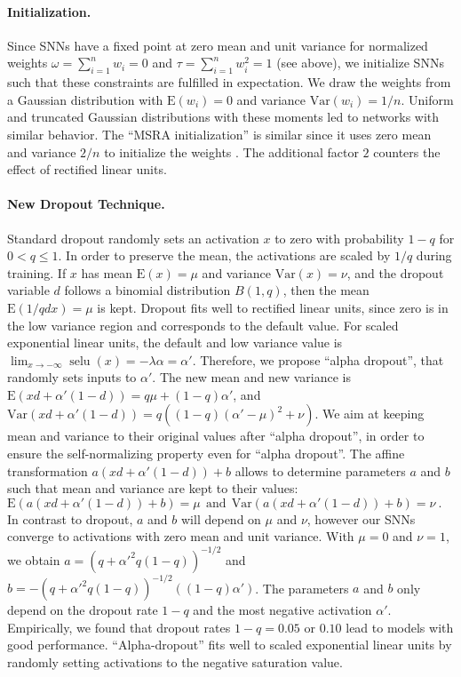 \documentclass{article}
\newcommand\EXP{\mathbf{\mathrm{E}}}
\newcommand\VAR{\mathbf{\mathrm{Var}}}
\renewcommand{\leq}{\leqslant}
\DeclareMathOperator{\selu}{selu}
\begin{document}
\paragraph{Initialization.}
\label{sec:init} 
Since SNNs have a fixed point at zero mean and unit variance 
for normalized weights $\omega=\sum_{i=1}^n w_i=0$ and
$\tau=\sum_{i=1}^n w_i^2=1$ (see above), 
we initialize SNNs such that these
constraints are fulfilled in expectation.
We draw the weights from a Gaussian distribution 
with $\EXP(w_i)=0$ and variance $\VAR(w_i)=1/n$.
Uniform and truncated Gaussian distributions with these moments 
led to networks with similar behavior. 
The ``MSRA initialization''  is similar since 
it uses zero mean and variance $2/n$ to initialize the weights \citep{bib:He2015init}.
The additional factor $2$ counters the effect of rectified 
linear units.

\paragraph{New Dropout Technique.}
\label{sec:dropout} 
Standard dropout randomly sets an activation $x$ to zero with probability $1-q$ for $0 < q \leq 1$. 
In order to preserve the mean, the activations are scaled by $1/q$ during training. 
If $x$ has mean $\EXP(x)=\mu$ and variance
$\VAR(x)=\nu$, and the dropout variable $d$ follows
a binomial distribution $B(1,q)$, then the mean $\EXP(1/q d x)= \mu$ is kept.
Dropout fits well to rectified linear units, since
zero is in the low variance region and corresponds
to the default value.
For scaled exponential linear units, the default and low variance
value is $\lim_{x \to -\infty} \selu(x)=-\lambda \alpha=\alpha'$. 
Therefore, we propose ``alpha dropout'', 
that randomly sets inputs to $\alpha'$. 
The new mean and new variance is
$\EXP(x d + \alpha' (1-d)) = q \mu + (1-q) \alpha'$, and 
$\VAR(x d + \alpha' (1-d)) = q ((1-q)(\alpha'-\mu)^2+\nu )$.
We aim at keeping mean and variance to their original values after ``alpha
dropout'', in order to ensure the self-normalizing property even for ``alpha dropout''.
The affine transformation $a(x d + \alpha'(1-d))+b$ allows to
determine parameters $a$ and $b$ such that mean and variance are kept to their values: 
$\EXP(a(x d + \alpha'(1-d))+b)=\mu \ \ \text{and} \ \ \VAR(a(x d + \alpha'(1-d))+b)=\nu \ .$
In contrast to dropout, $a$ and $b$ will depend on $\mu$ and $\nu$,
however our SNNs converge to activations with
zero mean and unit variance.  
With $\mu=0$ and $\nu=1$, we obtain $a=\left(q+\alpha'^2q(1-q)\right)^{-1/2}$ and $b=-\left(q+\alpha'^2q(1-q)\right)^{-1/2} \left((1-q)\alpha'\right)$.
The parameters $a$ and $b$ only depend on the dropout rate $1-q$ 
and the most negative activation $\alpha'$. 
Empirically, we found that dropout rates $1-q=0.05$ or $0.10$ lead to models with good performance.
``Alpha-dropout'' fits well to scaled exponential linear units by randomly setting 
activations to the negative saturation value.
\end{document}

